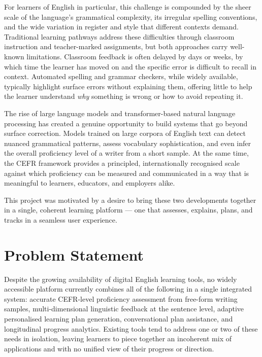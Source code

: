 \documentclass[12pt, a4paper]{report}
\begin{document}
For learners of English in particular, this challenge is compounded by the sheer scale of the language's grammatical complexity, its irregular spelling conventions, and the wide variation in register and style that different contexts demand. Traditional learning pathways address these difficulties through classroom instruction and teacher-marked assignments, but both approaches carry well-known limitations. Classroom feedback is often delayed by days or weeks, by which time the learner has moved on and the specific error is difficult to recall in context. Automated spelling and grammar checkers, while widely available, typically highlight surface errors without explaining them, offering little to help the learner understand \textit{why} something is wrong or how to avoid repeating it.

The rise of large language models and transformer-based natural language processing has created a genuine opportunity to build systems that go beyond surface correction. Models trained on large corpora of English text can detect nuanced grammatical patterns, assess vocabulary sophistication, and even infer the overall proficiency level of a writer from a short sample. At the same time, the CEFR framework provides a principled, internationally recognised scale against which proficiency can be measured and communicated in a way that is meaningful to learners, educators, and employers alike.

This project was motivated by a desire to bring these two developments together in a single, coherent learning platform — one that assesses, explains, plans, and tracks in a seamless user experience.

\section{Problem Statement}

Despite the growing availability of digital English learning tools, no widely accessible platform currently combines all of the following in a single integrated system: accurate CEFR-level proficiency assessment from free-form writing samples, multi-dimensional linguistic feedback at the sentence level, adaptive personalised learning plan generation, conversational plan assistance, and longitudinal progress analytics. Existing tools tend to address one or two of these needs in isolation, leaving learners to piece together an incoherent mix of applications and with no unified view of their progress or direction.
\end{document}
